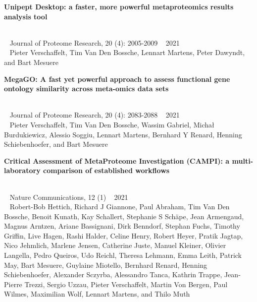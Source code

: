 \pagebreak

\begin{large}\textbf{\textsf{Unipept Desktop: a faster, more powerful metaproteomics results analysis tool}}\end{large} \\
\faBook ~ \textsf{Journal of Proteome Research, 20 (4): 2005-2009} \hfill \faCalendar ~ \textsf{2021} \\
{
    \myriad
    \faUser ~ \textsf{Pieter Verschaffelt}, Tim Van Den Bossche, Lennart Martens, Peter Dawyndt, and Bart Mesuere \\
}

\begin{large}\textbf{\textsf{MegaGO: A fast yet powerful approach to assess functional gene ontology similarity across meta-omics data sets}}\end{large} \\
\faBook ~ \textsf{Journal of Proteome Research, 20 (4): 2083-2088} \hfill \faCalendar ~ \textsf{2021} \\
{
    \myriad
    \faUser ~ \textsf{Pieter Verschaffelt}, Tim Van Den Bossche, Wassim Gabriel, Michał Burdukiewicz, Alessio Soggiu, Lennart Martens, Bernhard Y Renard, Henning Schiebenhoefer, and Bart Mesuere \\
}

\begin{large}\textbf{\textsf{Critical Assessment of MetaProteome Investigation (CAMPI): a multi-laboratory comparison of established workflows}}\end{large} \\
\faBook ~ \textsf{Nature Communications, 12 (1)} \hfill \faCalendar ~ \textsf{2021} \\
{
    \myriad
    \faUser ~ Robert-Bob Hettich, Richard J Giannone, Paul Abraham, Tim Van Den Bossche, Benoit Kunath, Kay Schallert, Stephanie S Schäpe, Jean Armengaud, Magnus Arntzen, Ariane Bassignani, Dirk Benndorf, Stephan Fuchs, Timothy Griffin, Live Hagen, Rashi Halder, Celine Henry, Robert Heyer, Pratik Jagtap, Nico Jehmlich, Marlene Jensen, Catherine Juste, Manuel Kleiner, Olivier Langella, Pedro Queiros, Udo Reichl, Theresa Lehmann, Emma Leith, Patrick May, Bart Mesuere, Guylaine Miotello, Bernhard Renard, Henning Schiebenhoefer, Alexander Sczyrba, Alessandro Tanca, Kathrin Trappe, Jean-Pierre Trezzi, Sergio Uzzau, \textsf{Pieter Verschaffelt}, Martin Von Bergen, Paul Wilmes, Maximilian Wolf, Lennart Martens, and Thilo Muth \\
}

